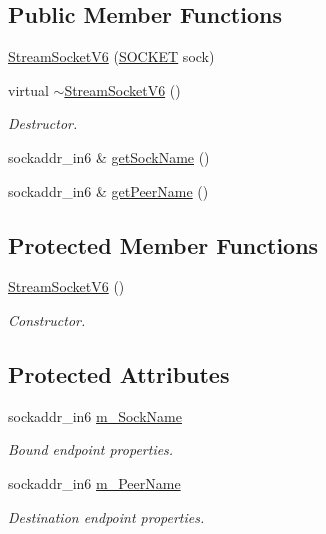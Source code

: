 \subsection*{Public Member Functions}
\begin{DoxyCompactItemize}
\item 
\hyperlink{classStreamSocketV6_a5054358161d8ef234de9aa0bdb125b39}{Stream\+Socket\+V6} (\hyperlink{sockclasslib_8h_a8dc8083897335125630f1af5dafd5831}{S\+O\+C\+K\+ET} sock)
\item 
virtual \hyperlink{classStreamSocketV6_a5708fcef318b11a9992f6b0b1861b2ff}{$\sim$\+Stream\+Socket\+V6} ()
\begin{DoxyCompactList}\small\item\em Destructor. \end{DoxyCompactList}\item 
sockaddr\+\_\+in6 \& \hyperlink{classStreamSocketV6_a93f4d15bfc95c567da19372d18e44cf1}{get\+Sock\+Name} ()
\item 
sockaddr\+\_\+in6 \& \hyperlink{classStreamSocketV6_a8ebf6f50686e62c8aa080a2a47d4f82e}{get\+Peer\+Name} ()
\end{DoxyCompactItemize}
\subsection*{Protected Member Functions}
\begin{DoxyCompactItemize}
\item 
\hyperlink{classStreamSocketV6_a0853a7bf3a3d52e4fd0fbed57e2424ef}{Stream\+Socket\+V6} ()
\begin{DoxyCompactList}\small\item\em Constructor. \end{DoxyCompactList}\end{DoxyCompactItemize}
\subsection*{Protected Attributes}
\begin{DoxyCompactItemize}
\item 
sockaddr\+\_\+in6 \hyperlink{classStreamSocketV6_a85f854ff218fbdeb902fd2878fe25526}{m\+\_\+\+Sock\+Name}
\begin{DoxyCompactList}\small\item\em Bound endpoint properties. \end{DoxyCompactList}\item 
sockaddr\+\_\+in6 \hyperlink{classStreamSocketV6_a1817bd2ca5296c8adc8a73234b9ce1cd}{m\+\_\+\+Peer\+Name}
\begin{DoxyCompactList}\small\item\em Destination endpoint properties. \end{DoxyCompactList}\end{DoxyCompactItemize}
